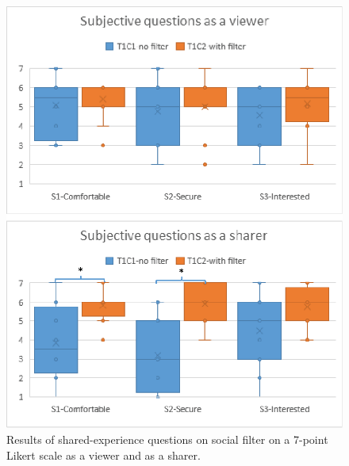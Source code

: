 
\begin{figure}[h]
    \begin{center}
    \includegraphics[width=.8\linewidth]{images/54-hiding-frontier18/images-14.eps}
    \caption{Results of shared-experience questions on social filter on a 7-point Likert scale as a viewer and as a sharer.}
    \label{fig:frontier18:result-shared-experience-questions-filter}
    \end{center}
\end{figure}

